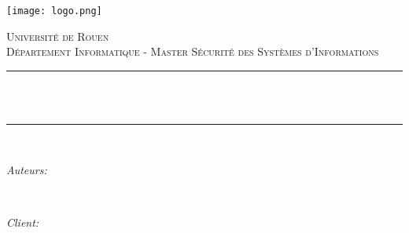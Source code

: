 \begin{titlepage}

\newcommand{\HRule}{\rule{\linewidth}{0.5mm}} %


\texttt{[image: logo.png]}\\[1cm] %
 

\center %


\textsc{\Large Université de Rouen}\\[0.5cm] %
\textsc{\large Département Informatique - Master Sécurité des Systèmes d'Informations}\\[0.5cm] %

\makeatletter
\HRule \\[0.4cm]
{ \huge \bfseries \@title}\\[0.4cm] %
\HRule \\[1.5cm]
 

\begin{minipage}{0.4\textwidth}
\begin{flushleft} \large
\emph{Auteurs:}\\
\@author %
\end{flushleft}
\end{minipage}
~
\begin{minipage}{0.4\textwidth}
\begin{flushright} \large
\emph{Client:} \\
\client %
\end{flushright}
\end{minipage}\\[6cm]
\makeatother


\end{titlepage}
